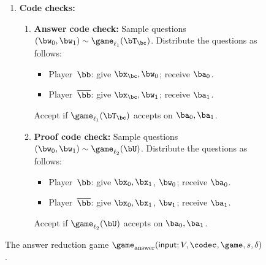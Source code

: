 {\begin{figure}
\begin{enumerate}
\begin{enumerate}
\begin{itemize}
			\item[$\circ$] Player~$\bb$: give $(\bx_0, \bx_1)$, $\bT_0, \bT_1, \bU$; receive $\ba_0, \ba_1, \ba_2$.
			\item[$\circ$] Player~$\overline{\bb}$: give $\bx_0, \bx_1, \bU$; receive $\ba_{2}'$.
			\end{itemize}
		Accept if $\ba_2 = \ba_2'$.
	\end{enumerate}
	\item \textbf{Code checks:}
	\begin{enumerate}
	\item \textbf{Answer code check:}
		Sample questions $(\bw_0, \bw_1) \sim \game_{\ell_1}(\bT_{\bc})$.
		Distribute the questions as follows:
			\begin{itemize}
			\item[$\circ$] Player~$\bb$: give $\bx_{\bc}, \bw_{0}$; receive $\ba_0$.
			\item[$\circ$] Player~$\overline{\bb}$: give $\bx_{\bc}, \bw_{1}$; receive $\ba_1$.
			\end{itemize}
		Accept if $\game_{\ell_1}(\bT_{\bc})$ accepts on $\ba_0, \ba_1$.
	\item \textbf{Proof code check:}
		Sample questions $(\bw_0, \bw_1) \sim \game_{\ell_2}(\bU)$.
		Distribute the questions as follows:
			\begin{itemize}
			\item[$\circ$] Player~$\bb$: give $\bx_0, \bx_1$, $\bw_{0}$; receive $\ba_0$.
			\item[$\circ$] Player~$\overline{\bb}$: give $\bx_0, \bx_1$, $\bw_{1}$; receive $\ba_1$.
			\end{itemize}
		Accept if $\game_{\ell_2}(\bU)$ accepts on $\ba_0, \ba_1$.
	\end{enumerate}
    \end{enumerate}
    \caption{The answer reduction game $\game_{\mathrm{answer}}(\mathsf{input};V, \codec, \game, s, \delta)$.\label{fig:answer-reduction}}
  \end{figure}
}

